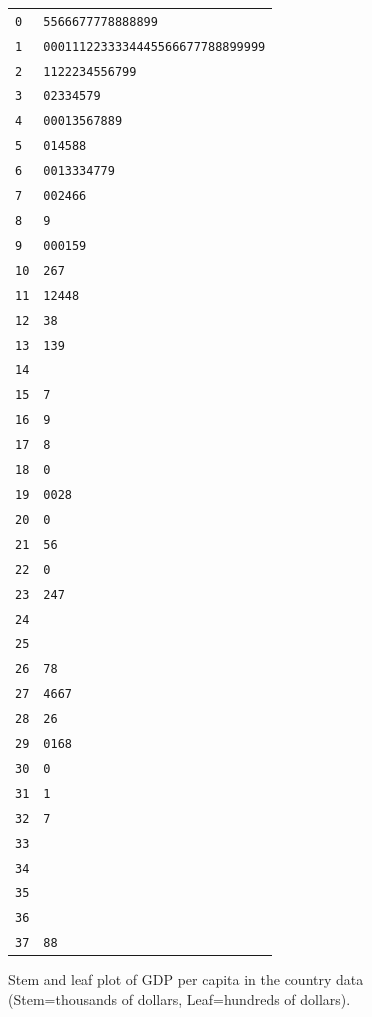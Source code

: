 \begin{figure}
\caption{Stem and leaf plot of GDP per capita in the country data
(Stem=thousands of dollars, Leaf=hundreds of dollars).}
\label{f_stemgdp}

\begin{tabular}{l|l}
\texttt{0} & \texttt{5566677778888899}\\
\texttt{1} & \texttt{0001112233334445566677788899999} \\
\texttt{2} & \texttt{1122234556799}\\
\texttt{3} & \texttt{02334579}\\
\texttt{4} & \texttt{00013567889}\\
\texttt{5} & \texttt{014588}\\
\texttt{6} & \texttt{0013334779}\\
\texttt{7} & \texttt{002466}\\
\texttt{8} & \texttt{9} \\
\texttt{9} & \texttt{000159}\\
\texttt{10}& \texttt{267}\\
\texttt{11}& \texttt{12448}\\
\texttt{12}& \texttt{38}\\
\texttt{13}& \texttt{139}\\
\texttt{14}& \\
\texttt{15}& \texttt{7}\\
\texttt{16}& \texttt{9}\\
\texttt{17}& \texttt{8}\\
\texttt{18}& \texttt{0}\\
\texttt{19}& \texttt{0028}\\
\texttt{20}& \texttt{0}\\
\texttt{21}& \texttt{56}\\
\texttt{22}& \texttt{0}\\
\texttt{23}& \texttt{247}\\
\texttt{24} & \\
\texttt{25} & \\
\texttt{26} & \texttt{78}\\
\texttt{27} & \texttt{4667}\\
\texttt{28} & \texttt{26}\\
\texttt{29} & \texttt{0168}\\
\texttt{30} & \texttt{0}\\
\texttt{31} & \texttt{1}\\
\texttt{32} & \texttt{7}\\
\texttt{33} & \\
\texttt{34} & \\
\texttt{35} & \\
\texttt{36} & \\
\texttt{37} & \texttt{88}
\end{tabular}
\end{figure}

